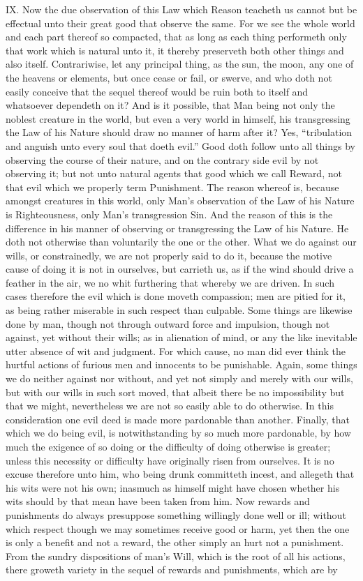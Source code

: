 IX. Now the due observation of this Law which Reason teacheth us cannot but be effectual unto their great good that observe the same. For we see the whole world and each part thereof so compacted, that as long as each thing performeth only that work which is natural unto it, it thereby preserveth both other things and also itself. Contrariwise, let any principal thing, as the sun, the moon, any one of the heavens or elements, but once cease or fail, or swerve, and who doth not easily conceive that the sequel thereof would be ruin both to itself and whatsoever dependeth on it? And is it possible, that Man being not only the noblest creature in the world, but even a very world in himself, his transgressing the Law of his Nature should draw no manner of harm after it? Yes, “tribulation and anguish unto every soul that doeth evil.” Good doth follow unto all things by observing the course of their nature, and on the contrary side evil by not observing it; but not unto natural agents that good which we call Reward, not that evil which we properly term Punishment. The reason whereof is, because amongst creatures in this world, only Man’s observation of the Law of his Nature is Righteousness, only Man’s transgression Sin. And the reason of this is the difference in his manner of observing or transgressing the Law of his Nature. He doth not otherwise than voluntarily the one or the other. What we do against our wills, or constrainedly, we are not properly said to do it, because the motive cause of doing it is not in ourselves, but carrieth us, as if the wind should drive a feather in the air, we no whit furthering that whereby we are driven. In such cases therefore the evil which is done moveth compassion; men are pitied for it, as being rather miserable in such respect than culpable. Some things are likewise done by man, though not through outward force and impulsion, though not against, yet without their wills; as in alienation of mind, or any the like inevitable utter absence of wit and judgment. For which cause, no man did ever think the hurtful actions of furious men and innocents to be punishable. Again, some things we do neither against nor without, and yet not simply and merely with our wills, but with our wills in such sort moved, that  albeit there be no impossibility but that we might, nevertheless we are not so easily able to do otherwise. In this consideration one evil deed is made more pardonable than another. Finally, that which we do being evil, is notwithstanding by so much more pardonable, by how much the exigence of so doing or the difficulty of doing otherwise is greater; unless this necessity or difficulty have originally risen from ourselves. It is no excuse therefore unto him, who being drunk committeth incest, and allegeth that his wits were not his own; inasmuch as himself might have chosen whether his wits should by that mean have been taken from him. Now rewards and punishments do always presuppose something willingly done well or ill; without which respect though we may sometimes receive good or harm, yet then the one is only a benefit and not a reward, the other simply an hurt not a punishment. From the sundry dispositions of man’s Will, which is the root of all his actions, there groweth variety in the sequel of rewards and punishments, which are by 